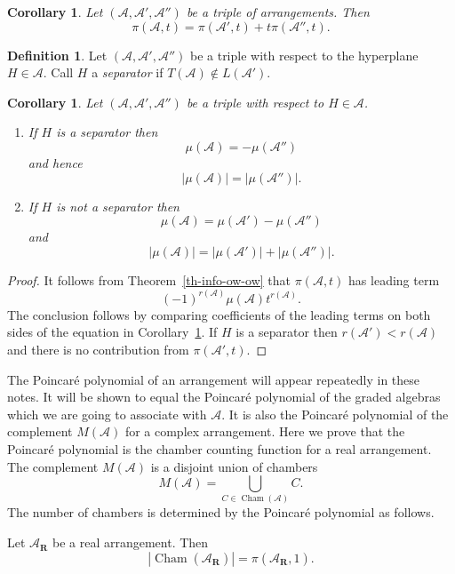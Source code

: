 \documentclass[manuscript, printscheme]{aomart}
\newtheorem[{}\it]{thm}{Theorem}[section]
\newtheorem{cor}[thm]{Corollary}
\theoremstyle{definition}
\newtheorem{defn}{Definition}[section]
\newtheorem*[{}\it]{notation}{Notation}
\newcommand{\thmref}[1]{Theorem~\ref{#1}}
\newcommand{\A}{\mathcal{A}}
\DeclareMathOperator{\Cham}{Cham}
\newcommand{\envert}[1]{\left\lvert#1\right\rvert}
\let\abs=\envert
\begin{document}
\begin{cor}\label{tripleA}
Let $(\A,\A',\A'')$ be a triple of arrangements. Then
\[ \pi (\A,t) = \pi (\A',t) + t \pi (\A'',t). \]
\end{cor}

\begin{defn}
Let $(\A,\A',\A'')$ be a triple with respect to
the hyperplane $H \in \A$. Call $H$ a \textit{separator}
if $T(\A) \not\in L(\A')$.
\end{defn}

\begin{cor}\label{nsep}
Let $(\A,\A',\A'')$ be a triple with respect to $H \in \A$.
\begin{enumerate}
\renewcommand{\labelenumi}{(\roman{enumi})}
\item
If $H$ is a separator then
\[ \mu (\A) = - \mu (\A'') \]
and hence
\[ \abs{\mu (\A)} = \abs{ \mu (\A'')}. \]

\item If $H$ is not a separator then
\[\mu (\A) = \mu (\A') - \mu (\A'') \]
and
\[ \abs{\mu (\A)} = \abs{\mu (\A')} + \abs{\mu (\A'')}. \]
\end{enumerate}
\end{cor}

\begin{proof}
It follows from \thmref{th-info-ow-ow} that $\pi(\A,t)$
has leading term
\[(-1)^{r(\A)}\mu (\A)t^{r(\A)}.\]
The conclusion
follows by comparing coefficients of the leading
terms on both sides of the equation in
Corollary~\ref{tripleA}. If $H$ is a separator then
$r(\A') < r(\A)$ and there is no contribution
from $\pi (\A',t)$.
\end{proof}

The Poincar\'e polynomial of an arrangement
will appear repeatedly
in these notes. It will be shown to equal the
Poincar\'e polynomial
of the graded algebras which we are going to
associate with $\A$. It is also the Poincar\'e
polynomial of the complement $M(\A)$ for a
complex arrangement. Here we prove
that the Poincar\'e polynomial is the chamber
counting function for a real arrangement. The
complement $M(\A)$ is a disjoint union of chambers
\[M(\A) = \bigcup_{C \in \Cham(\A)} C.\]
The number
of chambers is determined by the Poincar\'e
polynomial as follows.

\begin{thm}\label{th-realarr}
Let $\A_{\mathbf{R}}$ be a real arrangement. Then
\[ \abs{\Cham(\A_{\mathbf{R}})} = \pi (\A_{\mathbf{R}},1). \]
\end{thm}
\end{document}

